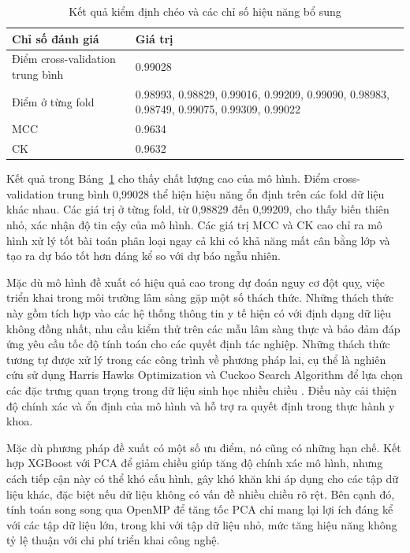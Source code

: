 \begin{table}[H]
\centering
\caption{Kết quả kiểm định chéo và các chỉ số hiệu năng bổ sung}\label{tab:cv2}
\begin{tabularx}{\textwidth}{lX}
\toprule
\textbf{Chỉ số đánh giá} & \textbf{Giá trị}\\
\midrule
Điểm cross-validation trung bình & 0.99028\\
Điểm ở từng fold & 0.98993, 0.98829, 0.99016, 0.99209, 0.99090, 0.98983, 0.98749, 0.99075, 0.99309, 0.99022\\
MCC & 0.9634\\
CK & 0.9632\\
\bottomrule
\end{tabularx}
\end{table}

Kết quả trong Bảng~\ref{tab:cv2} cho thấy chất lượng cao của mô hình. Điểm cross-validation trung bình 0,99028 thể hiện hiệu năng ổn định trên các fold dữ liệu khác nhau. Các giá trị ở từng fold, từ 0,98829 đến 0,99209, cho thấy biến thiên nhỏ, xác nhận độ tin cậy của mô hình. Các giá trị MCC và CK cao chỉ ra mô hình xử lý tốt bài toán phân loại ngay cả khi có khả năng mất cân bằng lớp và tạo ra dự báo tốt hơn đáng kể so với dự báo ngẫu nhiên.

Mặc dù mô hình đề xuất có hiệu quả cao trong dự đoán nguy cơ đột quỵ, việc triển khai trong môi trường lâm sàng gặp một số thách thức. Những thách thức này gồm tích hợp vào các hệ thống thông tin y tế hiện có với định dạng dữ liệu không đồng nhất, nhu cầu kiểm thử trên các mẫu lâm sàng thực và bảo đảm đáp ứng yêu cầu tốc độ tính toán cho các quyết định tác nghiệp. Những thách thức tương tự được xử lý trong các công trình về phương pháp lai, cụ thể là nghiên cứu sử dụng Harris Hawks Optimization và Cuckoo Search Algorithm để lựa chọn các đặc trưng quan trọng trong dữ liệu sinh học nhiều chiều . Điều này cải thiện độ chính xác và ổn định của mô hình và hỗ trợ ra quyết định trong thực hành y khoa.

Mặc dù phương pháp đề xuất có một số ưu điểm, nó cũng có những hạn chế. Kết hợp XGBoost với PCA để giảm chiều giúp tăng độ chính xác mô hình, nhưng cách tiếp cận này có thể khó cấu hình, gây khó khăn khi áp dụng cho các tập dữ liệu khác, đặc biệt nếu dữ liệu không có vấn đề nhiều chiều rõ rệt. Bên cạnh đó, tính toán song song qua OpenMP để tăng tốc PCA chỉ mang lại lợi ích đáng kể với các tập dữ liệu lớn, trong khi với tập dữ liệu nhỏ, mức tăng hiệu năng không tỷ lệ thuận với chi phí triển khai công nghệ.

